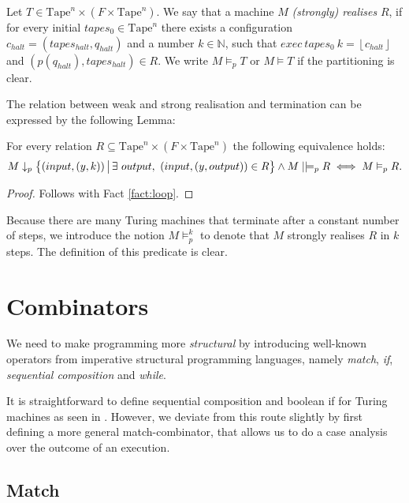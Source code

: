 \documentclass{psartcl}
\newcommand{\setOf}[1]{\bigl \{ #1 \bigr \}}
\newcommand{\setMap}[2]{\setOf{#1 \,\big|\, #2}}
\newcommand{\Nat}{\mathbb{N}}
\newcommand{\Some}[1]{\left\lfloor #1\right\rfloor}
\newcommand{\Tape}{\txt{Tape}}
\newcommand{\Tapes}[1]{\Tape^{#1}}
\DeclareRobustCommand{\VDash}{\mathrel{||}\joinrel\Relbar}
\newcommand{\txt}[1]{\text{#1}}
\begin{document}
\begin{definition}
  \label{def:realise}
  Let $T \in \Tapes{n} \times (F \times \Tapes{n})$.  We say that a machine $M$ \emph{(strongly) realises} $R$, if for every initial
  $tapes_0 \in \Tapes{n}$ there exists a configuration $c_{halt} = (tapes_{halt}, q_{halt})$ and a number $k \in \Nat$, such that
  $exec~tapes_0~k = \Some{c_{halt}}$ and $(p(q_{halt}), tapes_{halt}) \in R$.  We write $M \vDash_{p} T$ or $M \vDash T$ if the partitioning is clear.
\end{definition}

The relation between weak and strong realisation and termination can be expressed by the following Lemma:

\begin{lemma}
  \label{lem:realise-term}
  For every relation $R \subseteq \Tapes{n} \times (F \times \Tapes{n})$ the following equivalence holds:
  $$M \downarrow_p \setMap{(input,(y, k))}{\exists~output,~(input, (y, output)) \in R} \land M \VDash_p R \iff M \vDash_p R.$$
\end{lemma}
\begin{proof}
  Follows with Fact \ref{fact:loop}.
\end{proof}

Because there are many Turing machines that terminate after a constant number of steps, we introduce the notion $M \vDash_p^k$ to denote that $M$
strongly realises $R$ in $k$ steps.  The definition of this predicate is clear.

\section{Combinators}

We need to make programming more \textit{structural} by introducing well-known operators from imperative structural programming languages, namely
\emph{match}, \emph{if}, \emph{sequential composition} and \emph{while}.

It is straightforward to define sequential composition and boolean if for Turing machines as seen in \cite{Asperti}.
However, we deviate from this route slightly by first defining a more general match-combinator, that allows us to do a case analysis over the outcome
of an execution.

\subsection{Match}
\end{document}
